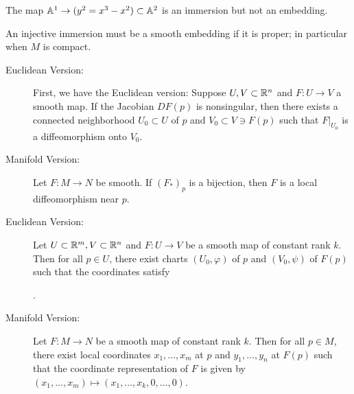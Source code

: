 \documentclass[twoside, 10pt]{article}
\begin{document}
    \begin{exm} The map $\mathbb{A}^1 \to (y^2 = x^3-x^2) \subset \mathbb{A}^2$ is an immersion
    but not an embedding.  \end{exm}

    \begin{rmk} An injective immersion must be a smooth embedding if it is
    proper; in particular when $M$ is compact.  \end{rmk}

    \begin{thm} \begin{description} \item[Euclidean
        Version:] First, we have the Euclidean version: Suppose $U,V \subset
        \mathbb{R}^n$ and $F:U \to V$ a smooth map. If the Jacobian $DF(p)$ is
        nonsingular, then there exists a connected neighborhood $U_0 \subset U$
        of $p$ and $V_0 \subset V \ni F(p)$ such that $F|_{U_0}$ is a
        diffeomorphism onto $V_0$.  \item[Manifold Version:] Let $F:M \to N$ be
smooth. If $(F_*)_p$ is a bijection, then $F$ is a local diffeomorphism near
$p$.  \end{description} \end{thm}

    \begin{thm} \begin{description} \item[Euclidean Version:] Let
        $U \subset \mathbb{R}^m, V \subset \mathbb{R}^n$ and $F:U \to V$ be a smooth map of
        constant rank $k$. Then for all $p \in U$, there exist charts $(U_0,
        \varphi)$ of $p$ and $(V_0, \psi)$ of $F(p)$ such that the coordinates
        satisfy \begin{center} .  \end{center} \item[Manifold
Version:] Let $F:M \to N$ be a smooth map of constant rank $k$. Then for all $p
\in M$, there exist local coordinates $x_1, \ldots, x_m$ at $p$ and $y_1,
\ldots, y_n$ at $F(p)$ such that the coordinate representation of $F$ is given
by $(x_1, \ldots, x_m) \mapsto (x_1, \ldots, x_k, 0, \ldots, 0)$.
\end{description} \end{thm}
\end{document}
